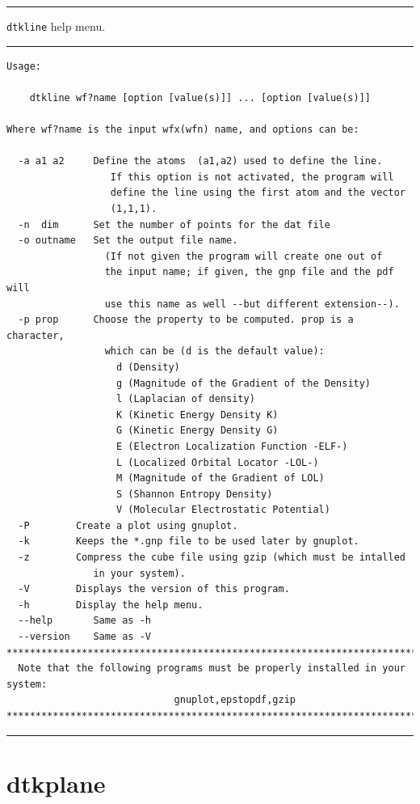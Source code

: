 \rule{\textwidth}{1pt}
{\center\texttt{dtkline} help menu.\\}
\rule{\textwidth}{1pt}
\begin{footnotesize}
\begin{verbatim}
Usage:

	dtkline wf?name [option [value(s)]] ... [option [value(s)]]

Where wf?name is the input wfx(wfn) name, and options can be:

  -a a1 a2     Define the atoms  (a1,a2) used to define the line.
            	  If this option is not activated, the program will 
            	  define the line using the first atom and the vector
            	  (1,1,1).
  -n  dim      Set the number of points for the dat file
  -o outname   Set the output file name.
                 (If not given the program will create one out of
                 the input name; if given, the gnp file and the pdf will
                 use this name as well --but different extension--).
  -p prop      Choose the property to be computed. prop is a character,
                 which can be (d is the default value): 
                   d (Density)
                   g (Magnitude of the Gradient of the Density)
                   l (Laplacian of density)
                   K (Kinetic Energy Density K)
                   G (Kinetic Energy Density G)
                   E (Electron Localization Function -ELF-)
                   L (Localized Orbital Locator -LOL-)
                   M (Magnitude of the Gradient of LOL)
                   S (Shannon Entropy Density)
                   V (Molecular Electrostatic Potential)
  -P        Create a plot using gnuplot.
  -k        Keeps the *.gnp file to be used later by gnuplot.
  -z        Compress the cube file using gzip (which must be intalled
               in your system).
  -V        Displays the version of this program.
  -h        Display the help menu.
  --help       Same as -h
  --version    Same as -V
********************************************************************************
  Note that the following programs must be properly installed in your system:
                             gnuplot,epstopdf,gzip
********************************************************************************
\end{verbatim}
\end{footnotesize}
\rule{\textwidth}{1pt}

\section{dtkplane}

